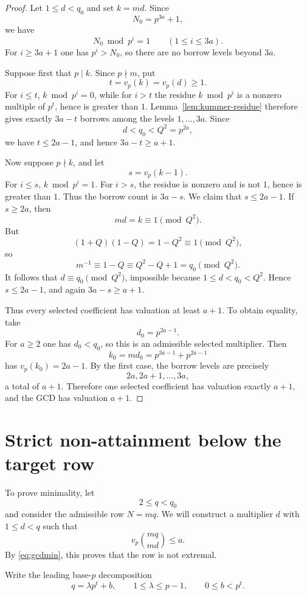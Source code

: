 \documentclass[11pt]{article}
\theoremstyle{definition}
\theoremstyle{remark}
\begin{document}
\begin{proof}
Let $1\le d<q_0$ and set $k=md$. Since
\[
  N_0=p^{3a}+1,
\]
we have
\[
  N_0\bmod p^i=1
  \qquad(1\le i\le3a).
\]
For $i\ge3a+1$ one has $p^i>N_0$, so there are no borrow levels beyond $3a$.

Suppose first that $p\mid k$. Since $p\nmid m$, put
\[
  t=v_p(k)=v_p(d)\ge1.
\]
For $i\le t$, $k\bmod p^i=0$, while for $i>t$ the residue $k\bmod p^i$ is a nonzero multiple of $p^t$, hence is greater than $1$. Lemma~\ref{lem:kummer-residue} therefore gives exactly $3a-t$ borrows among the levels $1,\dots,3a$. Since
\[
  d<q_0<Q^2=p^{2a},
\]
we have $t\le2a-1$, and hence $3a-t\ge a+1$.

Now suppose $p\nmid k$, and let
\[
  s=v_p(k-1).
\]
For $i\le s$, $k\bmod p^i=1$. For $i>s$, the residue is nonzero and is not $1$, hence is greater than $1$. Thus the borrow count is $3a-s$. We claim that $s\le2a-1$. If $s\ge2a$, then
\[
  md=k\equiv1\pmod{Q^2}.
\]
But
\[
  (1+Q)(1-Q)=1-Q^2\equiv1\pmod{Q^2},
\]
so
\[
  m^{-1}\equiv1-Q\equiv Q^2-Q+1=q_0\pmod{Q^2}.
\]
It follows that $d\equiv q_0\pmod{Q^2}$, impossible because $1\le d<q_0<Q^2$. Hence $s\le2a-1$, and again $3a-s\ge a+1$.

Thus every selected coefficient has valuation at least $a+1$. To obtain equality, take
\[
  d_0=p^{2a-1}.
\]
For $a\ge2$ one has $d_0<q_0$, so this is an admissible selected multiplier. Then
\[
  k_0=md_0=p^{3a-1}+p^{2a-1}
\]
has $v_p(k_0)=2a-1$. By the first case, the borrow levels are precisely
\[
  2a,2a+1,\dots,3a,
\]
a total of $a+1$. Therefore one selected coefficient has valuation exactly $a+1$, and the GCD has valuation $a+1$.
\end{proof}

\section{Strict non-attainment below the target row}\label{sec:Bminimal}

To prove minimality, let
\[
  2\le q<q_0
\]
and consider the admissible row $N=mq$. We will construct a multiplier $d$ with $1\le d<q$ such that
\begin{equation}\label{eq:strictgoal}
  v_p\binom{mq}{md}\le a.
\end{equation}
By \eqref{eq:gcdmin}, this proves that the row is not extremal.

Write the leading base-$p$ decomposition
\[
  q=\lambda p^t+b,
  \qquad1\le\lambda\le p-1,
  \qquad0\le b<p^t.
\]
\end{document}
